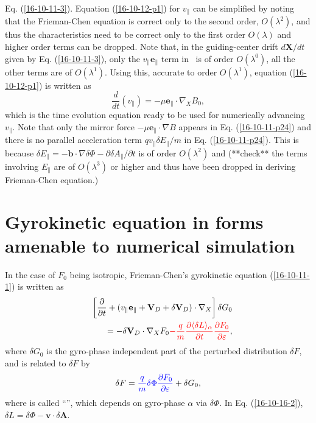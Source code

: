 \documentclass{llncs}
\newcommand{\tmcolor}[2]{{\color{#1}{#2}}}
\begin{document}
Eq. (\ref{16-10-11-3}). Equation (\ref{16-10-12-p1}) for $v_{\parallel}$ can
be simplified by noting that the Frieman-Chen equation is correct only to the
second order, $O (\lambda^2)$, and thus the characteristics need to be correct
only to the first order $O (\lambda)$ and higher order terms can be dropped.
Note that, in the guiding-center drift $d\mathbf{X}/ d t$ given by Eq.
(\ref{16-10-11-3}), only the $v_{\parallel} \mathbf{e}_{\parallel}$ term in \
is of order $O (\lambda^0)$, all the other terms are of $O (\lambda^1)$. Using
this, accurate to order $O (\lambda^1)$, equation (\ref{16-10-12-p1}) is
written as
\begin{equation}
  \label{16-10-11-p24} \frac{d}{d t} (v_{\parallel}) = - \mu
  \mathbf{e}_{\parallel} \cdot \nabla_X B_0,
\end{equation}
which is the time evolution equation ready to be used for numerically
advancing $v_{\parallel}$. Note that only the mirror force $- \mu
\mathbf{e}_{\parallel} \cdot \nabla B$ appears in Eq. (\ref{16-10-11-p24}) and
there is no parallel acceleration term $q v_{\parallel} \delta E_{\parallel} /
m$ in Eq. (\ref{16-10-11-p24}). This is because $\delta E_{\parallel} =
-\mathbf{b} \cdot \nabla \delta \Phi - \partial \delta A_{\parallel} /
\partial t$ is of order $O (\lambda^2)$ and (**check** the terms involving
$E_{\parallel}$ are of $O (\lambda^3)$ or higher and thus have been dropped in
deriving Frieman-Chen equation.)

\section{Gyrokinetic equation in forms amenable to numerical simulation}

In the case of $F_0$ being isotropic, Frieman-Chen's gyrokinetic equation
(\ref{16-10-11-1}) is written as
\begin{eqnarray}
  &  & \left[ \frac{\partial}{\partial t} + (v_{\parallel}
  \mathbf{e}_{\parallel} +\mathbf{V}_D + \delta \mathbf{V}_D) \cdot \nabla_X
  \right] \delta G_0 \nonumber\\
  &  & = - \delta \mathbf{V}_D \cdot \nabla_X F_0 \tmcolor{red}{- \frac{q}{m}
  \frac{\partial \langle \delta L \rangle_{\alpha}}{\partial t}
  \frac{\partial F_0}{\partial \varepsilon}},  \label{16-10-16-2}
\end{eqnarray}
where $\delta G_0$ is the gyro-phase independent part of the perturbed
distribution $\delta F$, and is related to $\delta F$ by
\begin{equation}
  \delta F = \tmcolor{blue}{\frac{q}{m} \delta \Phi \frac{\partial
  F_0}{\partial \varepsilon}} + \delta G_0,
\end{equation}
where \tmcolor{blue}{the first term} is called ``\tmcolor{blue}{the adiabatic
term}'', which depends on gyro-phase $\alpha$ via $\delta \Phi$. In Eq.
(\ref{16-10-16-2}), $\delta L = \delta \Phi -\mathbf{v} \cdot \delta
\mathbf{A}$.
\end{document}
